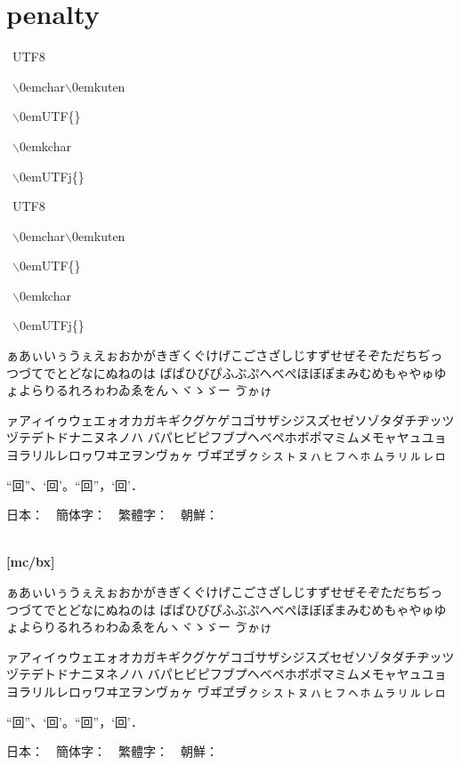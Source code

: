 \documentclass[a4paper,titlepage,draft\@landscape@]{\class}
\begin{document}
\section{penalty}
\edef\bs{$\backslash$\kern0em}

~UTF8

~\bs char\bs kuten

~\bs UTF\{\}

\ifuptexmode
{}~\bs kchar

~\bs UTFj\{\}
\fi


~UTF8

~\bs char\bs kuten

~\bs UTF\{\}

\ifuptexmode
{}~\bs kchar

~\bs UTFj\{\}
\fi


\clearpage
[mc/m]

ぁあぃいぅうぇえぉおかがきぎくぐけげこごさざしじすずせぜそぞただちぢっつづてでとどなにぬねのは
ばぱひびぴふぶぷへべぺほぼぽまみむめもゃやゅゆょよらりるれろゎわゐゑをんヽヾゝゞー
\ifuptexmode
ゔゕゖ
\fi

ァアィイゥウェエォオカガキギクグケゲコゴサザシジスズセゼソゾタダチヂッツヅテデトドナニヌネノハ
バパヒビピフブプヘベペホボポマミムメモャヤュユョヨラリルレロヮワヰヱヲンヴヵヶ
\ifuptexmode
ヷヸヹヺㇰㇱㇲㇳㇴㇵㇶㇷㇸㇹㇺㇻㇼㇽㇾㇿ
\fi

“回”、‘回’。“回”，‘回’．

日本：~~簡体字：~~繁體字：~~朝鮮：\\
~~%
~~%

{\bfseries%
[mc/bx]

ぁあぃいぅうぇえぉおかがきぎくぐけげこごさざしじすずせぜそぞただちぢっつづてでとどなにぬねのは
ばぱひびぴふぶぷへべぺほぼぽまみむめもゃやゅゆょよらりるれろゎわゐゑをんヽヾゝゞー
\ifuptexmode
ゔゕゖ
\fi

ァアィイゥウェエォオカガキギクグケゲコゴサザシジスズセゼソゾタダチヂッツヅテデトドナニヌネノハ
バパヒビピフブプヘベペホボポマミムメモャヤュユョヨラリルレロヮワヰヱヲンヴヵヶ
\ifuptexmode
ヷヸヹヺㇰㇱㇲㇳㇴㇵㇶㇷㇸㇹㇺㇻㇼㇽㇾㇿ
\fi

“回”、‘回’。“回”，‘回’．

日本：~~簡体字：~~繁體字：~~朝鮮：\\
~~%
~~%
}
\end{document}
